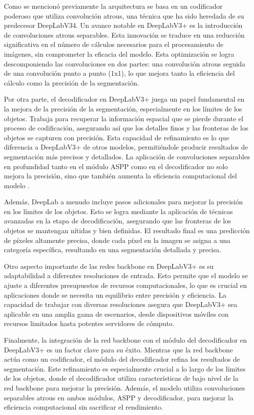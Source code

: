 Como se mencionó previamente la arquitectura se basa en un codificador poderoso que utiliza convolución atrous, una técnica que ha sido heredada de su predecesor DeepLabV34. Un avance notable en DeepLabV3+ es la introducción de convoluciones atrous separables. Esta innovación se traduce en una reducción significativa en el número de cálculos necesarios para el procesamiento de imágenes, sin comprometer la eficacia del modelo. Esta optimización se logra descomponiendo las convoluciones en dos partes: una convolución atrous seguida de una convolución punto a punto (1x1), lo que mejora tanto la eficiencia del cálculo como la precisión de la segmentación.

Por otra parte, el decodificador en DeepLabV3+ juega un papel fundamental en la mejora de la precisión de la segmentación, especialmente en los límites de los objetos. Trabaja para recuperar la información espacial que se pierde durante el proceso de codificación, asegurando así que los detalles finos y las fronteras de los objetos se capturen con precisión. Esta capacidad de refinamiento es lo que diferencia a DeepLabV3+ de otros modelos, permitiéndole producir resultados de segmentación más precisos y detallados.  La aplicación de convoluciones separables en profundidad tanto en el módulo ASPP como en el decodificador no solo mejora la precisión, sino que también aumenta la eficiencia computacional del modelo \cite{chen2018}.

Además, DeepLab a menudo incluye pasos adicionales para mejorar la precisión en los límites de los objetos. Esto se logra mediante la aplicación de técnicas avanzadas en la etapa de decodificación, asegurando que las fronteras de los objetos se mantengan nítidas y bien definidas. El resultado final es una predicción de píxeles altamente precisa, donde cada píxel en la imagen se asigna a una categoría específica, resultando en una segmentación detallada y precisa.

Otro aspecto importante de las redes backbone en DeepLabV3+ es su adaptabilidad a diferentes resoluciones de entrada. Esto permite que el modelo se ajuste a diferentes presupuestos de recursos computacionales, lo que es crucial en aplicaciones donde se necesita un equilibrio entre precisión y eficiencia. La capacidad de trabajar con diversas resoluciones asegura que DeepLabV3+ sea aplicable en una amplia gama de escenarios, desde dispositivos móviles con recursos limitados hasta potentes servidores de cómputo.

Finalmente, la integración de la red backbone con el módulo del decodificador en DeepLabV3+ es un factor clave para su éxito. Mientras que la red backbone actúa como un codificador, el módulo del decodificador refina los resultados de segmentación. Este refinamiento es especialmente crucial a lo largo de los límites de los objetos, donde el decodificador utiliza características de bajo nivel de la red backbone para mejorar la precisión. Además, el modelo utiliza convoluciones separables atrous en ambos módulos, ASPP y decodificador, para mejorar la eficiencia computacional sin sacrificar el rendimiento.
